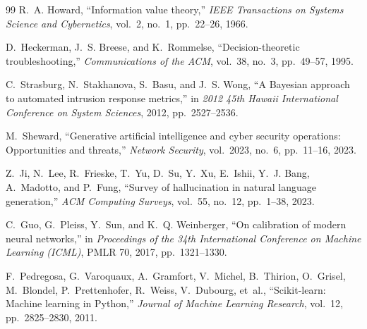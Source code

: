 \documentclass[12pt,a4paper]{report}
\begin{document}
\begin{thebibliography}{99}
R.~A. Howard, ``Information value theory,'' \emph{IEEE Transactions on Systems Science and Cybernetics}, vol.~2, no.~1, pp.~22--26, 1966.

D.~Heckerman, J.~S. Breese, and K.~Rommelse, ``Decision-theoretic troubleshooting,'' \emph{Communications of the ACM}, vol.~38, no.~3, pp.~49--57, 1995.

C.~Strasburg, N.~Stakhanova, S.~Basu, and J.~S. Wong, ``A Bayesian approach to automated intrusion response metrics,'' in \emph{2012 45th Hawaii International Conference on System Sciences}, 2012, pp.~2527--2536.

M.~Sheward, ``Generative artificial intelligence and cyber security operations: Opportunities and threats,'' \emph{Network Security}, vol.~2023, no.~6, pp.~11--16, 2023.

Z.~Ji, N.~Lee, R.~Frieske, T.~Yu, D.~Su, Y.~Xu, E.~Ishii, Y.~J. Bang, A.~Madotto, and P.~Fung, ``Survey of hallucination in natural language generation,'' \emph{ACM Computing Surveys}, vol.~55, no.~12, pp.~1--38, 2023.

C.~Guo, G.~Pleiss, Y.~Sun, and K.~Q. Weinberger, ``On calibration of modern neural networks,'' in \emph{Proceedings of the 34th International Conference on Machine Learning (ICML)}, PMLR 70, 2017, pp.~1321--1330.

F.~Pedregosa, G.~Varoquaux, A.~Gramfort, V.~Michel, B.~Thirion, O.~Grisel, M.~Blondel, P.~Prettenhofer, R.~Weiss, V.~Dubourg, et~al., ``Scikit-learn: Machine learning in Python,'' \emph{Journal of Machine Learning Research}, vol.~12, pp.~2825--2830, 2011.

\end{thebibliography}
\end{document}
